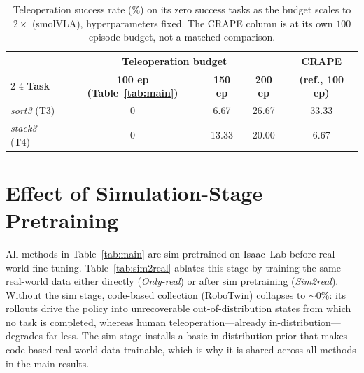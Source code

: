 \documentclass{article}
\begin{document}
\begin{table}[h]
\centering
\caption{Teleoperation success rate (\%) on its zero success tasks as the budget scales to $2\times$ (smolVLA), hyperparameters fixed. The CRAPE column is at its own $100$ episode budget, not a matched comparison.}
\label{tab:teleop_saturation}
\small
\setlength{\tabcolsep}{6pt}
\begin{tabular}{lccc|c}
\toprule
& \multicolumn{3}{c|}{\textbf{Teleoperation budget}} & \textbf{CRAPE} \\
\cmidrule(lr){2-4}
\textbf{Task} & \textbf{100 ep (Table~\ref{tab:main})} & \textbf{150 ep} & \textbf{200 ep} & \textbf{(ref., 100 ep)} \\
\midrule
\textit{sort3} (T3)  & 0 & 6.67 & 26.67 & 33.33 \\
\textit{stack3} (T4) & 0 & 13.33 & 20.00 & 6.67 \\
\bottomrule
\end{tabular}
\end{table}

\section{Effect of Simulation-Stage Pretraining}
\label{app:sim2real}

All methods in Table~\ref{tab:main} are sim-pretrained on Isaac~Lab before
real-world fine-tuning. Table~\ref{tab:sim2real} ablates this stage by training
the same real-world data either directly (\emph{Only-real}) or after sim
pretraining (\emph{Sim2real}). Without the sim stage, code-based collection
(RoboTwin) collapses to $\sim\!0\%$: its rollouts drive the policy into
unrecoverable out-of-distribution states from which no task is completed, whereas
human teleoperation---already in-distribution---degrades far less. The sim stage
installs a basic in-distribution prior that makes code-based real-world data
trainable, which is why it is shared across all methods in the main results.
\end{document}
